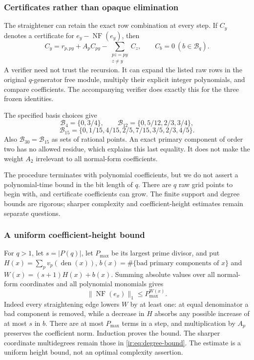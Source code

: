 \subsubsection{Certificates rather than opaque elimination}
The straightener can retain the exact row combination at every step.
If $C_y$ denotes a certificate for $e_y-\operatorname{NF}(e_y)$, then
\begin{equation}\label{ir:eq:certificate-recursion}
 C_y=r_{p,py}+A_pC_{py}-\sum_{\substack{pz=py\\z\ne y}}C_z,
 \qquad C_b=0\ (b\in\mathcal B_q).
\end{equation}
A verifier need not trust the recursion. It can expand the listed raw
rows in the original $q$-generator free module, multiply their explicit
integer polynomials, and compare coefficients. The accompanying
verifier does exactly this for the three frozen identities.

\begin{example}
The specified basis choices give
\[
 \mathcal B_4=\{0,3/4\},\qquad
 \mathcal B_{12}=\{0,5/12,2/3,3/4\},
\]
\[
 \mathcal B_{15}=\{0,1/15,4/15,2/5,7/15,3/5,2/3,4/5\}.
\]
Also $\mathcal B_{30}=\mathcal B_{15}$ as sets of rational points. An exact primary
component of order two has no allowed residue, which explains this
last equality. It does not make the weight $A_2$ irrelevant to all
normal-form coefficients.
\end{example}

The procedure terminates with polynomial coefficients, but we do not
assert a polynomial-time bound in the bit length of $q$. There are
$q$ raw grid points to begin with, and certificate coefficients can
grow. The finite support and degree bounds are rigorous; sharper
complexity and coefficient-height estimates remain separate questions.

\subsubsection{A uniform coefficient-height bound}
For $q>1$, let $s=|P(q)|$, let $P_{\max}$ be its largest prime divisor,
and put $H(x)=\sum_p v_p(\operatorname{den}(x))$,
$b(x)=\#\{\text{bad primary components of }x\}$ and
$W(x)=(s+1)H(x)+b(x)$. Summing absolute values over all normal-form
coordinates and all polynomial monomials gives
\[
 \|\operatorname{NF}(e_x)\|_1\le P_{\max}^{W(x)}.
\]
Indeed every straightening edge lowers $W$ by at least one: at equal
denominator a bad component is removed, while a decrease in $H$ absorbs
any possible increase of at most $s$ in $b$. There are at most
$P_{\max}$ terms in a step, and multiplication by $A_p$ preserves the
coefficient norm. Induction proves the bound. The sharper coordinate
multidegrees remain those in \eqref{ir:eq:degree-bound}. The estimate is
a uniform height bound, not an optimal complexity assertion.

